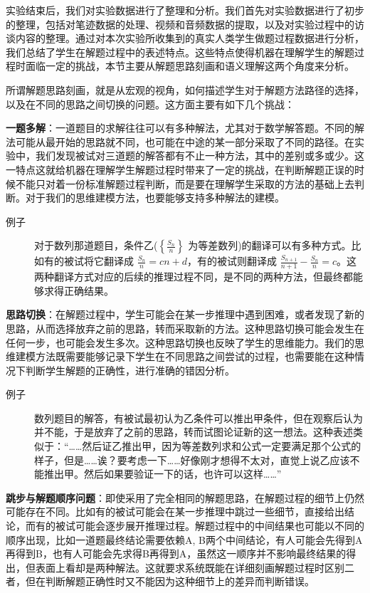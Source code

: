实验结束后，我们对实验数据进行了整理和分析。我们首先对实验数据进行了初步的整理，包括对笔迹数据的处理、视频和音频数据的提取，以及对实验过程中的访谈内容的整理。通过对本次实验所收集到的真实人类学生做题过程数据进行分析，我们总结了学生在解题过程中的表述特点。这些特点使得机器在理解学生的解题过程时面临一定的挑战，本节主要从解题思路刻画和语义理解这两个角度来分析。

所谓解题思路刻画，就是从宏观的视角，如何描述学生对于解题方法路径的选择，以及在不同的思路之间切换的问题。这方面主要有如下几个挑战：

\textbf{一题多解}：一道题目的求解往往可以有多种解法，尤其对于数学解答题。不同的解法可能从最开始的思路就不同，也可能在中途的某一部分采取了不同的路径。在实验中，我们发现被试对三道题的解答都有不止一种方法，其中的差别或多或少。这一特点这就给机器在理解学生解题过程时带来了一定的挑战，在判断解题正误的时候不能只对着一份标准解题过程判断，而是要在理解学生采取的方法的基础上去判断。对于我们的思维建模方法，也要能够支持多种解法的建模。

\begin{description}
    \item[例子] 对于数列那道题目，条件乙($\left\{\frac{S_n}{n}\right\}$ 为等差数列)的翻译可以有多种方式。比如有的被试将它翻译成 $\frac{S_n}{n} = cn+d$，有的被试则翻译成 $\frac{S_{n+1}}{n+1} - \frac{S_n}{n} = c$。这两种翻译方式对应的后续的推理过程不同，是不同的两种方法，但最终都能够求得正确结果。
\end{description}

\textbf{思路切换}：在解题过程中，学生可能会在某一步推理中遇到困难，或者发现了新的思路，从而选择放弃之前的思路，转而采取新的方法。这种思路切换可能会发生在任何一步，也可能会发生多次。这种思路切换也反映了学生的思维能力。我们的思维建模方法既需要能够记录下学生在不同思路之间尝试的过程，也需要能在这种情况下判断学生解题的正确性，进行准确的错因分析。

\begin{description}
    \item[例子] 数列题目的解答，有被试最初认为乙条件可以推出甲条件，但在观察后认为并不能，于是放弃了之前的思路，转而试图论证新的这一想法。这种表述类似于：“……然后证乙推出甲，因为等差数列求和公式一定要满足那个公式的样子，但是……诶？要考虑一下……好像刚才想得不太对，直觉上说乙应该不能推出甲。然后如果要验证一下的话，也许可以这样……”
\end{description}

\textbf{跳步与解题顺序问题}：即使采用了完全相同的解题思路，在解题过程的细节上仍然可能存在不同。比如有的被试可能会在某一步推理中跳过一些细节，直接给出结论，而有的被试可能会逐步展开推理过程。解题过程中的中间结果也可能以不同的顺序出现，比如一道题最终结论需要依赖A, B两个中间结论，有人可能会先得到A再得到B，也有人可能会先求得B再得到A，虽然这一顺序并不影响最终结果的得出，但表面上看却是两种解法。这就要求系统既能在详细刻画解题过程时区别二者，但在判断解题正确性时又不能因为这种细节上的差异而判断错误。

